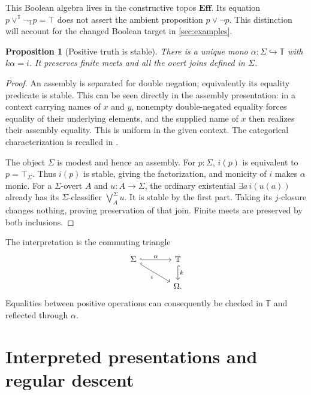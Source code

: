 \documentclass[11pt,a4paper]{article}
\numberwithin{equation}{section}
\newtheorem{proposition}[proposition]{Proposition}
\theoremstyle{definition}
\theoremstyle{remark}
\theoremstyle{plain}
\newcommand{\E}{\mathbf{Eff}}
\newcommand{\TV}{\mathbb T}
\newcommand{\incl}{\hookrightarrow}
\newcommand{\negT}{\neg_{\TV}}
\begin{document}
This Boolean algebra lives in the constructive topos $\E$. Its equation
$p\vee^{\TV}\negT p=\top$ does not assert the ambient proposition
$p\vee\neg p$. This distinction will account for the changed Boolean
target in \cref{sec:examples}.

\begin{proposition}[Positive truth is stable]
\label{prop:positive-stability}
There is a unique mono $\alpha:\Sigma\incl\TV$ with $k\alpha=i$.
It preserves finite meets and all the overt joins defined in $\Sigma$.
\end{proposition}
\begin{proof}
An assembly is separated for double negation; equivalently its equality
predicate is stable. This can be seen directly in the assembly
presentation: in a context carrying names of $x$ and $y$, nonempty
double-negated equality forces equality of their underlying elements,
and the supplied name of $x$ then realizes their assembly equality.
This is uniform in the given context. The categorical characterization
is recalled in \cite[Section~3.2]{hylandvariations}.

The object $\Sigma$ is modest and hence an assembly. For $p:\Sigma$,
$i(p)$ is equivalent to $p=\top_\Sigma$. Thus $i(p)$ is stable, giving
the factorization, and monicity of $i$ makes $\alpha$ monic. For a
$\Sigma$-overt $A$ and $u:A\to\Sigma$, the ordinary existential
$\exists a\,i(u(a))$ already has its $\Sigma$-classifier
$\bigvee_A^\Sigma u$. It is stable by the first part. Taking its
$j$-closure changes nothing, proving preservation of that join.
Finite meets are preserved by both inclusions.
\end{proof}

The interpretation is the commuting triangle
\begin{equation}\label{diag:truth-factorization}
\begin{tikzcd}[column sep=large]
 \Sigma\ar[r,hook,"\alpha"]\ar[dr,hook,"i"']&
 \TV\ar[d,hook,"k"]\\
 &\Omega.
\end{tikzcd}
\end{equation}
Equalities between positive operations can consequently be checked in
$\TV$ and reflected through $\alpha$.

\section{Interpreted presentations and regular descent}
\label{sec:descent}
\end{document}
